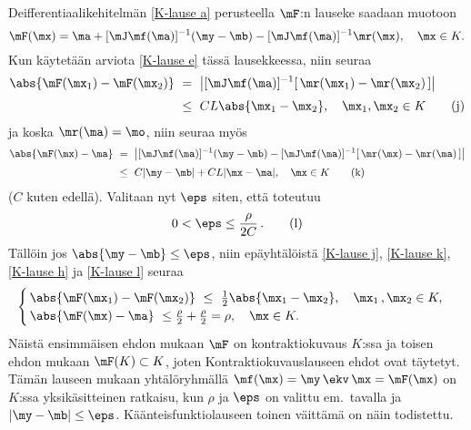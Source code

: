 Deifferentiaalikehitelmän \eqref{K-lause a} perusteella $\mF$:n lauseke saadaan muotoon
\[
\mF(\mx) = \ma + [\mJ\mf(\ma)]^{-1}(\my-\mb) - [\mJ\mf(\ma)]^{-1}\mr(\mx), \quad \mx \in K.
\]
Kun käytetään arviota \eqref{K-lause e} tässä lausekkeessa, niin seuraa
\begin{align} \label{K-lause j}
\abs{\mF(\mx_1)-\mF(\mx_2)}\ 
    &=\ \left|[\mJ\mf(\ma)]^{-1}[\,\mr(\mx_1)-\mr(\mx_2)\,]\right| \notag \\[1mm]
    &\le\ CL\abs{\mx_1-\mx_2}, \quad \mx_1,\mx_2\in K \tag{j}
\end{align}
ja koska $\mr(\ma)=\mo$, niin seuraa myös
\begin{align} \label{K-lause k}
\abs{\mF(\mx)-\ma}\ 
    &=\ \left|[\mJ\mf(\ma)]^{-1}(\my-\mb)
         -[\mJ\mf(\ma)]^{-1}[\,\mr(\mx)-\mr(\ma)\,]\right| \notag\\[1mm]
    &\le\ C|\my-\mb|+CL|\mx-\ma|, \quad \mx\in K \tag{k}
\end{align}
($C$ kuten edellä). Valitaan nyt $\eps$ siten, että toteutuu
\begin{equation} \label{K-lause l}
0<\eps\le\frac{\rho}{2C}\,. \tag{l}
\end{equation}
Tällöin jos $\abs{\my-\mb}\le\eps$, niin epäyhtälöistä \eqref{K-lause j}, \eqref{K-lause k},
\eqref{K-lause h} ja \eqref{K-lause l} seuraa
\[
\begin{cases} 
\,\abs{\mF(\mx_1)-\mF(\mx_2)}\ 
  \le\ \frac{1}{2}\abs{\mx_1-\mx_2}, \quad \mx_1\,,\mx_2 \in K, \\
\,\abs{\mF(\mx)-\ma}\ \le \frac{\rho}{2}+\frac{\rho}{2} = \rho, \quad \mx \in K.
\end{cases}
\]
Näistä ensimmäisen ehdon mukaan $\mF$ on kontraktiokuvaus $K$:ssa ja toisen ehdon mukaan
$\mF(K) \subset K$, joten Kontraktiokuvauslauseen ehdot ovat täytetyt. Tämän lauseen mukaan
yhtälöryhmällä $\mf(\mx)=\my\,\ekv\,\mx=\mF(\mx)$ on $K$:ssa yksikäsitteinen ratkaisu, kun
$\rho$ ja $\eps$ on valittu em.\ tavalla ja $|\my-\mb|\le\eps$. Käänteisfunktiolauseen
toinen väittämä on näin todistettu.


